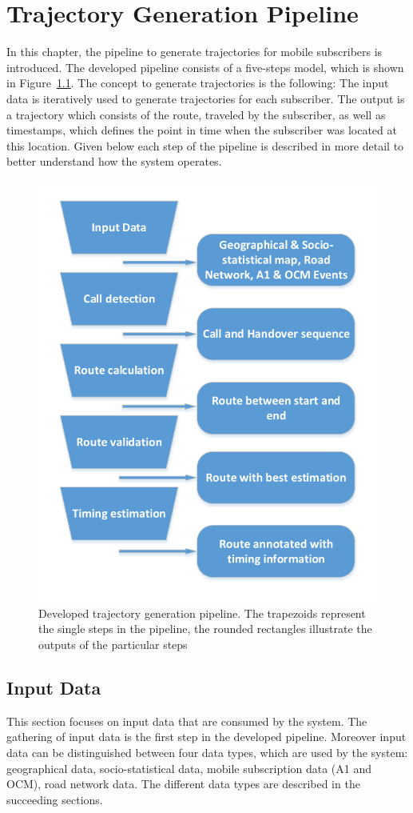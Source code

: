 \documentclass[master,english]{hgbthesis}
\begin{document}
\chapter{Trajectory Generation Pipeline}
\label{cha:concepts}
In this chapter, the pipeline to generate trajectories for mobile subscribers is introduced. The developed pipeline consists of a five-steps model, which is shown in Figure~\ref{fig:pipeline}. The concept to generate trajectories is the following: The input data is iteratively used to generate trajectories for each subscriber. The output is a trajectory which consists of the route, traveled by the subscriber, as well as timestamps, which defines the point in time when the subscriber was located at this location. Given below each step of the pipeline is described in more detail to better understand how the system operates.
\begin{figure}
	\centering
	\includegraphics[width=0.7\linewidth]{./images/pipeline}
	\caption{Developed trajectory generation pipeline. The trapezoids represent the single steps in the pipeline, the rounded rectangles illustrate the
	outputs of the particular steps}
	\label{fig:pipeline}
\end{figure}
\section{Input Data}
This section focuses on input data that are consumed by the system. The gathering of input data is the first step in the developed pipeline. Moreover input data can be distinguished between four data types, which are used by the system: geographical data, socio-statistical data, mobile subscription data (A1 and OCM), road network data. The different data types are described in the succeeding sections.
\end{document}
